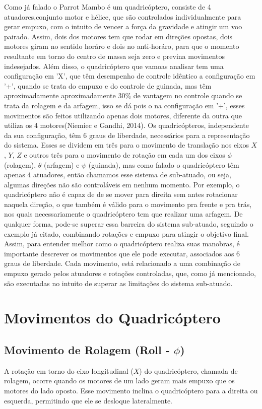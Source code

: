 Como já falado o Parrot Mambo é um quadricóptero, consiste de 4 atuadores,conjunto motor e hélice, que são controlados individualmente para gerar empuxo, com o intuito de vencer a força da gravidade e atingir um voo pairado. Assim, dois dos motores tem que rodar em direções opostas, dois motores giram no sentido horáro e dois no anti-horáro, para que o momento resultante em torno do centro de massa seja zero e previna movimentos indesejados.
Além disso, o quadricóptero que vamoas analisar tem uma configuração em 'X', que têm desempenho de controle idêntico a configuração em '+', quando se trata do empuxo e do controle de guinada, mas têm aproximadamente aproximadamente 30\% de vantagem no controle quando se trata da rolagem e da arfagem, isso se dá pois o na configuração em '+', esses movimentos são feitos utilizando apenas dois motores, diferente da outra que utiliza os 4 motores(Niemiec e Gandhi, 2014). 
Os quadricópteros, independente da sua configuração, têm 6 graus de liberdade, necessários para a representação do sistema. Esses se
dividem em três para o movimento de translação nos eixos \( X \), \( Y \), \( Z \) e outros três para o movimento de rotação em cada um dos eixos \( \phi \) (rolagem), \( \theta \) (arfagem) e \( \psi \) (guinada), mas como falado o quadricóptero têm apenas 4 atuadores, então chamamos esse sistema de sub-atuado, ou seja, algumas direções não são controláveis em nenhum momento. Por exemplo, o quadricóptero não é capaz de de se mover para direita sem antes rotacionar naquela direção, o que também é válido para o movimento pra frente e pra trás, nos quais necessariamente o quadricóptero tem que realizar uma arfagem. De qualquer forma, pode-se superar essa barreira do sistema sub-atuado, seguindo o exemplo já citado, combinando rotações e empuxo para atingir o objetivo final.
Assim, para entender melhor como o quadricóptero realiza suas manobras, é importante descrever os movimentos que ele pode executar, associados aos 6 graus de liberdade. Cada movimento, está relacionado a uma combinação de empuxo gerado pelos atuadores e rotações controladas, que, como já mencionado, são executadas no intuito de superar as limitações do sistema sub-atuado.

\section{Movimentos do Quadricóptero}

\subsection{Movimento de Rolagem (Roll - $\phi$)}
A rotação em torno do eixo longitudinal ($X$) do quadricóptero, chamada de rolagem, ocorre quando os motores de um lado geram mais empuxo que os motores do lado oposto. Esse movimento inclina o quadricóptero para a direita ou esquerda, permitindo que ele se desloque lateralmente.

